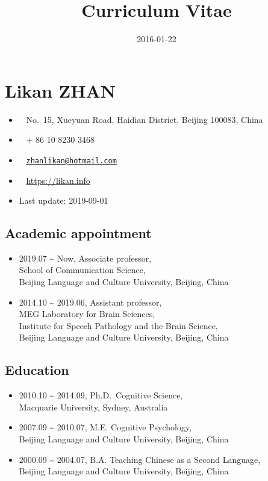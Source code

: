 \documentclass[12pt,]{article}
\title{Curriculum Vitae}
\author{}
\date{2016-01-22}
\providecommand{\tightlist}{%
  \setlength{\itemsep}{0pt}\setlength{\parskip}{0pt}}
\begin{document}
\maketitle

\hypertarget{likan-zhan}{%
\section{Likan ZHAN}\label{likan-zhan}}

\begin{itemize}
\tightlist
\item
  \faUniversity ~ No.~15, Xueyuan Road, Haidian District, Beijing
  100083, China
\item
  \faPhone* ~ + 86 10 8230 3468
\item
  \faEnvelope[regular] ~
  \href{mailto:zhanlikan@hotmail.com}{\nolinkurl{zhanlikan@hotmail.com}}
\item
  \faGlobe ~ \url{https://likan.info}
\item
  Last update: 2019-09-01
\end{itemize}

\hypertarget{academic-appointment}{%
\subsection{Academic appointment}\label{academic-appointment}}

\begin{itemize}
\item
  2019.07 \textasciitilde{} Now, Associate professor,\\
  School of Communication Science,\\
  Beijing Language and Culture University, Beijing, China
\item
  2014.10 \textasciitilde{} 2019.06, Assistant professor,\\
  MEG Laboratory for Brain Sciences, \\
  Institute for Speech Pathology and the Brain Science,\\
  Beijing Language and Culture University, Beijing, China
\end{itemize}

\hypertarget{education}{%
\subsection{Education}\label{education}}

\begin{itemize}
\item
  2010.10 \textasciitilde{} 2014.09, Ph.D.~Cognitive Science, \\
  Macquarie University, Sydney, Australia
\item
  2007.09 \textasciitilde{} 2010.07, M.E. Cognitive Psychology, \\
  Beijing Language and Culture University, Beijing, China
\item
  2000.09 \textasciitilde{} 2004.07, B.A. Teaching Chinese as a Second
  Language, \\
  Beijing Language and Culture University, Beijing, China
\end{itemize}
\end{document}
